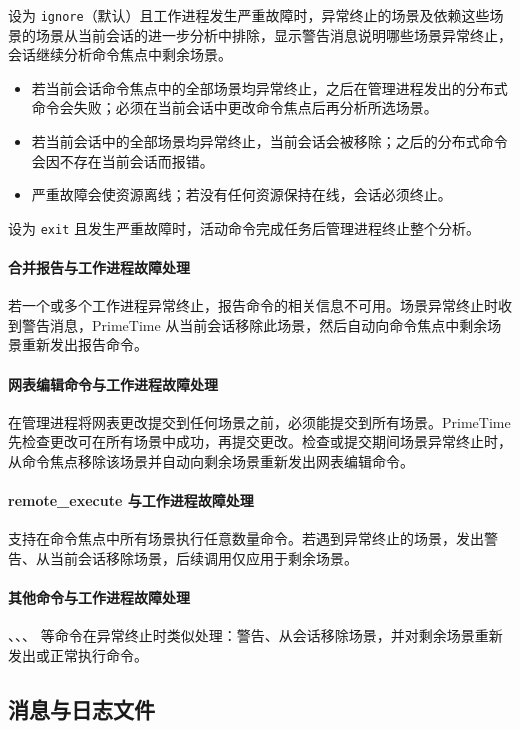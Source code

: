 设为 \texttt{ignore}（默认）且工作进程发生严重故障时，异常终止的场景及依赖这些场景的场景从当前会话的进一步分析中排除，显示警告消息说明哪些场景异常终止，会话继续分析命令焦点中剩余场景。
\begin{itemize}
  \item 若当前会话命令焦点中的全部场景均异常终止，之后在管理进程发出的分布式命令会失败；必须在当前会话中更改命令焦点后再分析所选场景。
  \item 若当前会话中的全部场景均异常终止，当前会话会被移除；之后的分布式命令会因不存在当前会话而报错。
  \item 严重故障会使资源离线；若没有任何资源保持在线，会话必须终止。
\end{itemize}

设为 \texttt{exit} 且发生严重故障时，活动命令完成任务后管理进程终止整个分析。

\paragraph{合并报告与工作进程故障处理}
若一个或多个工作进程异常终止，报告命令的相关信息不可用。场景异常终止时收到警告消息，PrimeTime 从当前会话移除此场景，然后自动向命令焦点中剩余场景重新发出报告命令。

\paragraph{网表编辑命令与工作进程故障处理}
在管理进程将网表更改提交到任何场景之前，必须能提交到所有场景。PrimeTime 先检查更改可在所有场景中成功，再提交更改。检查或提交期间场景异常终止时，从命令焦点移除该场景并自动向剩余场景重新发出网表编辑命令。

\paragraph{remote\_execute 与工作进程故障处理}
 支持在命令焦点中所有场景执行任意数量命令。若遇到异常终止的场景，发出警告、从当前会话移除场景，后续调用仅应用于剩余场景。

\paragraph{其他命令与工作进程故障处理}
、、、 等命令在异常终止时类似处理：警告、从会话移除场景，并对剩余场景重新发出或正常执行命令。


\subsection{消息与日志文件}
